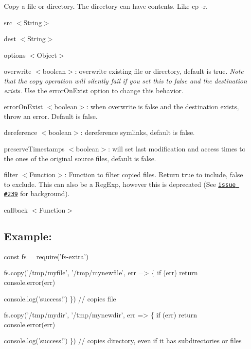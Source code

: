 Copy a file or directory. The directory can have contents. Like {\ttfamily cp -\/r}.


\begin{DoxyItemize}
\item {\ttfamily src} {\ttfamily $<$String$>$}
\item {\ttfamily dest} {\ttfamily $<$String$>$}
\item {\ttfamily options} {\ttfamily $<$Object$>$}
\begin{DoxyItemize}
\item {\ttfamily overwrite} {\ttfamily $<$boolean$>$}\+: overwrite existing file or directory, default is {\ttfamily true}. {\itshape Note that the copy operation will silently fail if you set this to {\ttfamily false} and the destination exists.} Use the {\ttfamily error\+On\+Exist} option to change this behavior.
\item {\ttfamily error\+On\+Exist} {\ttfamily $<$boolean$>$}\+: when {\ttfamily overwrite} is {\ttfamily false} and the destination exists, throw an error. Default is {\ttfamily false}.
\item {\ttfamily dereference} {\ttfamily $<$boolean$>$}\+: dereference symlinks, default is {\ttfamily false}.
\item {\ttfamily preserve\+Timestamps} {\ttfamily $<$boolean$>$}\+: will set last modification and access times to the ones of the original source files, default is {\ttfamily false}.
\item {\ttfamily filter} {\ttfamily $<$Function$>$}\+: Function to filter copied files. Return {\ttfamily true} to include, {\ttfamily false} to exclude. This can also be a Reg\+Exp, however this is deprecated (See \href{https://github.com/jprichardson/node-fs-extra/issues/239}{\tt issue \#239} for background).
\end{DoxyItemize}
\item {\ttfamily callback} {\ttfamily $<$Function$>$}
\end{DoxyItemize}

\subsection*{Example\+:}


\begin{DoxyCode}
const fs = require('fs-extra')

fs.copy('/tmp/myfile', '/tmp/mynewfile', err => \{
  if (err) return console.error(err)

  console.log('success!')
\}) // copies file

fs.copy('/tmp/mydir', '/tmp/mynewdir', err => \{
  if (err) return console.error(err)

  console.log('success!')
\}) // copies directory, even if it has subdirectories or files
\end{DoxyCode}


